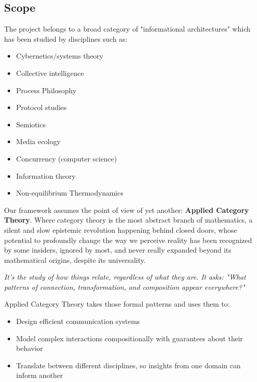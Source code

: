 \documentclass[11pt]{article}
\begin{document}
\subsection{Scope}

The project belongs to a broad category of "informational architectures" which has been studied by disciplines such as:

\begin{itemize}

\item Cybernetics/systems theory

\item Collective intelligence

\item Process Philosophy

\item Protocol studies

\item Semiotics

\item Media ecology

\item Concurrency (computer science)

\item Information theory

\item Non-equilibrium Thermodynamics

\end{itemize}

Our framework assumes the point of view of yet another: \textbf{Applied Category Theory}. Where category theory is the most abstract branch of mathematics, a silent and slow epistemic revolution happening behind closed doors, whose potential to profoundly change the way we perceive reality has been recognized by some insiders, ignored by most, and never really expanded beyond its mathematical origins, despite its universality.

\emph{It's the study of how things relate, regardless of what they are. It asks: "What patterns of connection, transformation, and composition appear everywhere?"}

Applied Category Theory takes those formal patterns and uses them to:

\begin{itemize}

\item Design efficient communication systems

\item Model complex interactions compositionally with guarantees about their behavior

\item Translate between different disciplines, so insights from one domain can inform another

\end{itemize}
\end{document}
